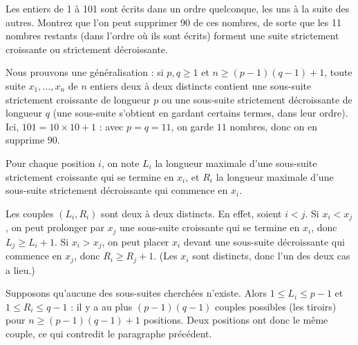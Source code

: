 \begin{problem}
    Les entiers de 1 à 101 sont écrits dans un ordre quelconque, les uns à la suite des autres. Montrez que l'on peut supprimer 90 de ces nombres, de sorte que les 11 nombres restants (dans l'ordre où ils sont écrits) forment une suite strictement croissante ou strictement décroissante.

    \begin{solution}
        Nous prouvons une généralisation : si \( p, q \geq 1 \) et \( n \geq (p-1)(q-1) + 1 \), toute suite \( x_1, \ldots, x_n \) de \( n \) entiers deux à deux distincts contient une sous-suite strictement croissante de longueur \( p \) ou une sous-suite strictement décroissante de longueur \( q \) (une sous-suite s'obtient en gardant certains termes, dans leur ordre). Ici, \( 101 = 10 \times 10 + 1 \) : avec \( p = q = 11 \), on garde \( 11 \) nombres, donc on en supprime \( 90 \).

        Pour chaque position \( i \), on note \( L_i \) la longueur maximale d'une sous-suite strictement croissante qui se termine en \( x_i \), et \( R_i \) la longueur maximale d'une sous-suite strictement décroissante qui commence en \( x_i \).

        Les couples \( (L_i, R_i) \) sont deux à deux distincts. En effet, soient \( i < j \). Si \( x_i < x_j \), on peut prolonger par \( x_j \) une sous-suite croissante qui se termine en \( x_i \), donc \( L_j \geq L_i + 1 \). Si \( x_i > x_j \), on peut placer \( x_i \) devant une sous-suite décroissante qui commence en \( x_j \), donc \( R_i \geq R_j + 1 \). (Les \( x_i \) sont distincts, donc l'un des deux cas a lieu.)

        Supposons qu'aucune des sous-suites cherchées n'existe. Alors \( 1 \leq L_i \leq p-1 \) et \( 1 \leq R_i \leq q-1 \) : il y a au plus \( (p-1)(q-1) \) couples possibles (les tiroirs) pour \( n \geq (p-1)(q-1) + 1 \) positions. Deux positions ont donc le même couple, ce qui contredit le paragraphe précédent.
        \end{solution}
\end{problem}


